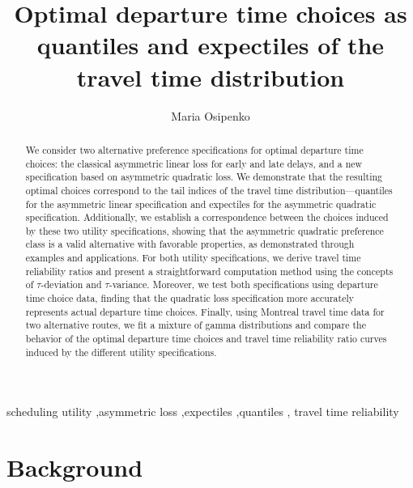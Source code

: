 \documentclass[preprint, 3p, authoryear]{elsarticle} %
\theoremstyle{definition}
\theoremstyle{definition}
\theoremstyle{definition}
\theoremstyle{definition}
\theoremstyle{remark}
\begin{document}
\begin{frontmatter}

  \title{Optimal departure time choices as quantiles and expectiles of the travel time distribution}
    \author[hwr]{Maria Osipenko%
  }
  
  \begin{abstract}
  We consider two alternative preference specifications for optimal departure time choices: the classical asymmetric linear loss for early and late delays, and a new specification based on asymmetric quadratic loss. We demonstrate that the resulting optimal choices correspond to the tail indices of the travel time distribution---quantiles for the asymmetric linear specification and expectiles for the asymmetric quadratic specification. Additionally, we establish a correspondence between the choices induced by these two utility specifications, showing that the asymmetric quadratic preference class is a valid alternative with favorable properties, as demonstrated through examples and applications. For both utility specifications, we derive travel time reliability ratios and present a straightforward computation method using the concepts of \(\tau\)-deviation and \(\tau\)-variance. Moreover, we test both specifications using departure time choice data, finding that the quadratic loss specification more accurately represents actual departure time choices. Finally, using Montreal travel time data for two alternative routes, we fit a mixture of gamma distributions and compare the behavior of the optimal departure time choices and travel time reliability ratio curves induced by the different utility specifications.
  \end{abstract}
    \begin{keyword}
    scheduling utility \sep asymmetric loss \sep expectiles \sep quantiles \sep 
    travel time reliability
  \end{keyword}
  
 \end{frontmatter}

\hypertarget{background}{%
\section{Background}\label{background}}
\end{document}
